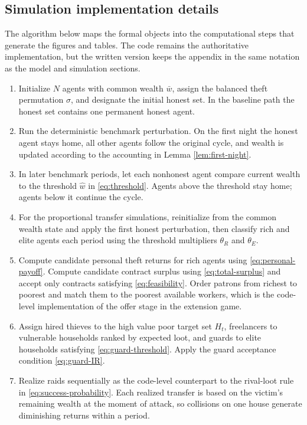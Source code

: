 \subsection{Simulation implementation details}

The algorithm below maps the formal objects into the computational steps that generate the figures and tables. The code remains the authoritative implementation, but the written version keeps the appendix in the same notation as the model and simulation sections.

\begin{enumerate}[leftmargin=1.5em]
    \item Initialize $N$ agents with common wealth $\bar{w}$, assign the balanced theft permutation $\sigma$, and designate the initial honest set. In the baseline path the honest set contains one permanent honest agent.
    \item Run the deterministic benchmark perturbation. On the first night the honest agent stays home, all other agents follow the original cycle, and wealth is updated according to the accounting in Lemma \ref{lem:first-night}.
    \item In later benchmark periods, let each nonhonest agent compare current wealth to the threshold $\widehat{w}$ in \eqref{eq:threshold}. Agents above the threshold stay home; agents below it continue the cycle.
    \item For the proportional transfer simulations, reinitialize from the common wealth state and apply the first honest perturbation, then classify rich and elite agents each period using the threshold multipliers $\theta_R$ and $\theta_E$.
    \item Compute candidate personal theft returns for rich agents using \eqref{eq:personal-payoff}. Compute candidate contract surplus using \eqref{eq:total-surplus} and accept only contracts satisfying \eqref{eq:feasibility}. Order patrons from richest to poorest and match them to the poorest available workers, which is the code-level implementation of the offer stage in the extension game.
    \item Assign hired thieves to the high value poor target set $H_t$, freelancers to vulnerable households ranked by expected loot, and guards to elite households satisfying \eqref{eq:guard-threshold}. Apply the guard acceptance condition \eqref{eq:guard-IR}.
    \item Realize raids sequentially as the code-level counterpart to the rival-loot rule in \eqref{eq:success-probability}. Each realized transfer is based on the victim's remaining wealth at the moment of attack, so collisions on one house generate diminishing returns within a period.

\end{enumerate}
